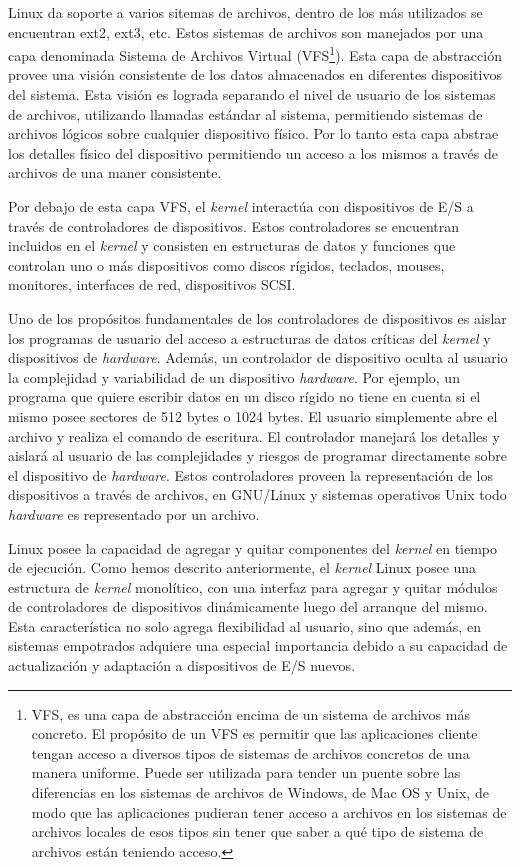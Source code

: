 Linux da soporte a varios sitemas de archivos, dentro de los más utilizados se
encuentran ext2, ext3, etc. Estos sistemas de archivos son manejados
por una capa denominada Sistema de Archivos Virtual (VFS\footnote{VFS, es una
capa de abstracción encima de un sistema de archivos más concreto. El propósito
de un VFS es permitir que las aplicaciones cliente tengan acceso a diversos
tipos de sistemas de archivos concretos de una manera uniforme. Puede ser
utilizada para tender un puente sobre las diferencias en los sistemas de
archivos de Windows, de Mac OS y Unix, de modo que las aplicaciones pudieran
tener acceso a archivos en los sistemas de archivos locales de esos tipos sin
tener que saber a qué tipo de sistema de archivos están teniendo acceso.}). Esta
capa de abstracción provee una visión consistente de los datos almacenados en
diferentes dispositivos del sistema. Esta visión es lograda separando el nivel
de usuario de los sistemas de archivos, utilizando llamadas estándar al
sistema, permitiendo sistemas de archivos lógicos sobre cualquier dispositivo
físico. Por lo tanto esta capa abstrae los detalles físico del dispositivo
permitiendo un acceso a los mismos a través de archivos de una maner
consistente.

Por debajo de esta capa VFS, el \emph{kernel} interactúa con dispositivos de E/S
a través de controladores de dispositivos. Estos controladores se encuentran
incluidos en el \emph{kernel} y consisten en estructuras de datos y funciones
que controlan uno o más dispositivos como discos rígidos, teclados, mouses,
monitores, interfaces de red, dispositivos SCSI.

Uno de los propósitos fundamentales de los controladores de dispositivos es
aislar los programas de usuario del acceso a estructuras de datos críticas del
\emph{kernel} y dispositivos de \emph{hardware}. Además, un controlador de
dispositivo oculta al usuario la complejidad y variabilidad de un dispositivo
\emph{hardware}. Por ejemplo, un programa que quiere escribir datos en un disco
rígido no tiene en cuenta si el mismo posee sectores de 512 bytes o 1024 bytes.
El usuario simplemente abre el archivo y realiza el comando de escritura. El
controlador manejará los detalles y aislará al usuario de las complejidades y
riesgos de programar directamente sobre el dispositivo de \emph{hardware}. Estos
controladores proveen la representación de los dispositivos a través de
archivos, en GNU/Linux y sistemas operativos Unix todo \emph{hardware} es
representado por un archivo.

Linux posee la capacidad de agregar y quitar componentes del \emph{kernel} en
tiempo de ejecución. Como hemos descrito anteriormente, el \emph{kernel} Linux
posee una estructura de \emph{kernel} monolítico, con una interfaz para agregar
y quitar módulos de controladores de dispositivos dinámicamente luego del
arranque del mismo. Esta característica no solo agrega flexibilidad al usuario,
sino que además, en sistemas empotrados adquiere una especial importancia debido
a su capacidad de actualización y adaptación a dispositivos de E/S
nuevos\cite{understanding}.

